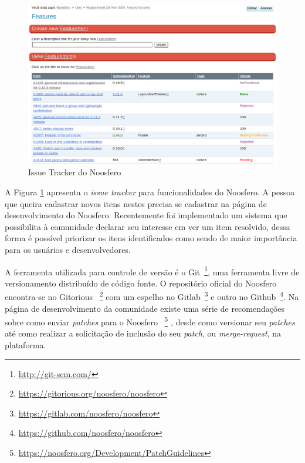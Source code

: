\begin{figure}[h]
	\centering
	\includegraphics[keepaspectratio=true,scale=0.4]
	  {figuras/issue-tracker.eps}
	\caption{Issue Tracker do Noosfero}
	\label{issue-tracker}
\end{figure}

A Figura \ref{issue-tracker} apresenta o \textit{issue tracker} para
funcionalidades do Noosfero.
%
A pessoa que queira cadastrar novos itens nestes precisa se cadastrar
na página de desenvolvimento do Noosfero.
%
Recentemente foi implementado um sistema que possibilita à comunidade declarar
seu interesse em ver um item resolvido, dessa forma é possível priorizar os
itens identificados como sendo de maior importância para os usuários e
desenvolvedores.

A ferramenta utilizada para controle de versão é o Git~\footnote{
\url{http://git-scm.com/}}, uma ferramenta livre de versionamento distribuído
de código fonte. O repositório oficial do Noosfero encontra-se no Gitorious
~\footnote{\url{https://gitorious.org/noosfero/noosfero}} com um espelho no
Gitlab~\footnote{\url{https://gitlab.com/noosfero/noosfero}} e outro no
Github~\footnote{\url{https://github.com/noosfero/noosfero}}.
%
Na página de desenvolvimento da comunidade existe uma série de recomendações
sobre como enviar \textit{patches} para o Noosfero%
~\footnote{\url{https://noosfero.org/Development/PatchGuidelines}}
, desde como versionar seu \textit{patches} até como realizar a solicitação de
inclusão do seu \textit{patch}, ou \textit{merge-request}, na plataforma.

